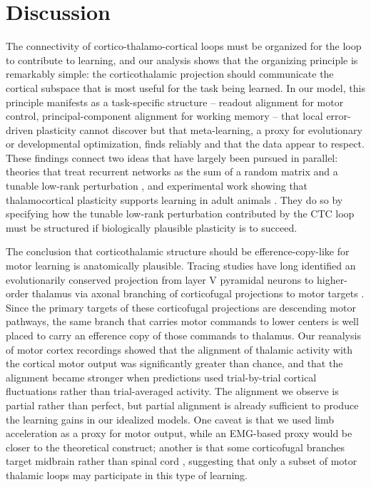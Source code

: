\documentclass[11pt]{article}
\begin{document}
\section{Discussion}

The connectivity of cortico-thalamo-cortical loops must be organized
for the loop to contribute to learning, and our analysis shows that
the organizing principle is remarkably simple: the corticothalamic
projection should communicate the cortical subspace that is most useful
for the task being learned. In our model, this principle manifests
as a task-specific structure -- readout alignment for motor control,
principal-component alignment for working memory -- that local
error-driven plasticity cannot discover but that meta-learning, a
proxy for evolutionary or developmental optimization, finds reliably
and that the data appear to respect. These findings connect two ideas
that have largely been pursued in parallel: theories that treat
recurrent networks as the sum of a random matrix and a tunable
low-rank perturbation \cite{mastrogiuseppe2018linking}, and
experimental work showing that thalamocortical plasticity supports
learning in adult animals \cite{hasegawa2018thalamocortical}. They do
so by specifying how the tunable low-rank perturbation contributed by
the CTC loop must be structured if biologically plausible plasticity
\cite{murray2019local, lillicrap2016random, gerstner2018eligibility}
is to succeed.

The conclusion that corticothalamic structure should be efference-copy-like
for motor learning is anatomically plausible. Tracing studies have long
identified an evolutionarily conserved projection from layer V
pyramidal neurons to higher-order thalamus via axonal branching of
corticofugal projections to motor targets \cite{yamawaki2015synaptic,
economo2018distinct}. Since the primary targets of these corticofugal
projections are descending motor pathways, the same branch that carries
motor commands to lower centers is well placed to carry an efference
copy of those commands to thalamus. Our reanalysis of motor cortex
recordings \cite{sauerbrei2020cortical} showed that the alignment of
thalamic activity with the cortical motor output was significantly
greater than chance, and that the alignment became stronger when
predictions used trial-by-trial cortical fluctuations rather than
trial-averaged activity. The alignment we observe is partial rather
than perfect, but partial alignment is already sufficient to produce
the learning gains in our idealized models. One caveat is that we used
limb acceleration as a proxy for motor output, while an EMG-based
proxy would be closer to the theoretical construct; another is that
some corticofugal branches target midbrain rather than spinal cord
\cite{economo2018distinct}, suggesting that only a subset of motor
thalamic loops may participate in this type of learning.
\end{document}
